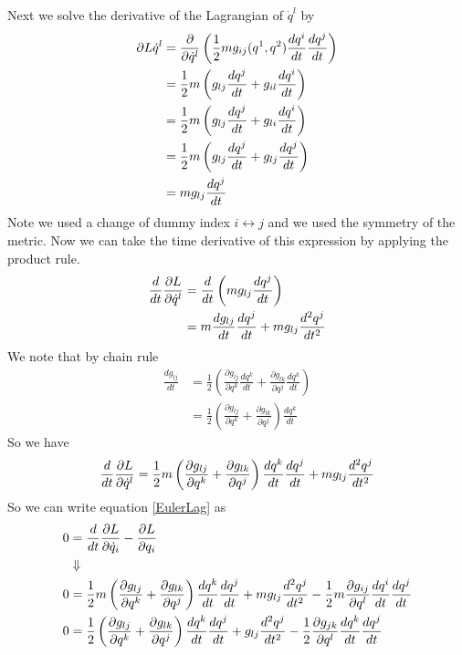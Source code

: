 \documentclass[11pt]{article}
\numberwithin{equation}{section}
\begin{document}
\begin{enumerate}[(a)]
Next we solve the derivative of the Lagrangian of $\dot{q}^l$ by
\begin{align*}
\partial{L}{\dot{q}^l} &= \frac{\partial{}}{\partial{\dot{q}^l}}\left(\frac{1}{2}mg_{ij}(q^1,q^2)\frac{dq^i}{dt}\frac{dq^j}{dt}\right)\\
&= \frac{1}{2}m\left(g_{lj}\frac{dq^j}{dt}+g_{il}\frac{dq^i}{dt}\right)\\
&= \frac{1}{2}m\left(g_{lj}\frac{dq^j}{dt}+g_{li}\frac{dq^i}{dt}\right)\\
&= \frac{1}{2}m\left(g_{lj}\frac{dq^j}{dt}+g_{lj}\frac{dq^j}{dt}\right)\\
&= mg_{lj}\frac{dq^j}{dt}
\end{align*}
Note we used a change of dummy index $i\leftrightarrow{j}$ and we used the symmetry of the 
metric. Now we can take the time derivative of this expression by applying the product rule.
\begin{align*}
\frac{d}{dt}\frac{\partial{L}}{\partial{\dot{q}^l}} &= \frac{d}{dt}\left(mg_{lj}\frac{dq^j}{dt}\right)\\
&= m\frac{dg_{lj}}{dt}\frac{dq^j}{dt}+mg_{lj}\frac{d^2q^j}{dt^2}
\end{align*}
We note that by chain rule
\begin{align*}
\frac{dg_{lj}}{dt} &= \frac{1}{2}\left(\frac{\partial g_{lj}}{\partial q^k}\frac{dq^k}{dt} + \frac{\partial g_{lk}}{\partial q^{j}}\frac{dq^{k}}{dt}\right)\\
&= \frac{1}{2}\left(\frac{\partial g_{lj}}{\partial q^k}+ \frac{\partial g_{lk}}{\partial q^{j}}\right)\frac{dq^k}{dt} 
\end{align*}
So we have
\begin{align*}
\frac{d}{dt}\frac{\partial{L}}{\partial{\dot{q}^l}} &= \frac{1}{2}m\left(\frac{\partial g_{lj}}{\partial q^k} + \frac{\partial g_{lk}}{\partial q^{j}}\right)\frac{dq^{k}}{dt}\frac{dq^j}{dt} + mg_{lj}\frac{d^2q^j}{dt^2}\\
\end{align*}
So we can write equation \ref{EulerLag} as
\begin{align*}
0 &= \frac{d}{dt}\frac{\partial L}{\partial\dot{q}_i} - \frac{\partial L}{\partial q_i} \\
&\Downarrow\\
0 &= \frac{1}{2}m\left(\frac{\partial g_{lj}}{\partial q^k} + \frac{\partial g_{lk}}{\partial q^{j}}\right)\frac{dq^{k}}{dt}\frac{dq^j}{dt} + mg_{lj}\frac{d^2q^j}{dt^2} - \frac{1}{2}m\partiald{g_{ij}}{q^l}\frac{dq^i}{dt}\frac{dq^j}{dt}\\
0 &= \frac{1}{2}\left(\frac{\partial g_{lj}}{\partial q^k} + \frac{\partial g_{lk}}{\partial q^{j}}\right)\frac{dq^{k}}{dt}\frac{dq^j}{dt} + g_{lj}\frac{d^2q^j}{dt^2} - \frac{1}{2}\partiald{g_{jk}}{q^l}\frac{dq^k}{dt}\frac{dq^j}{dt}\\

\end{align*}
\end{enumerate}
\end{document}
